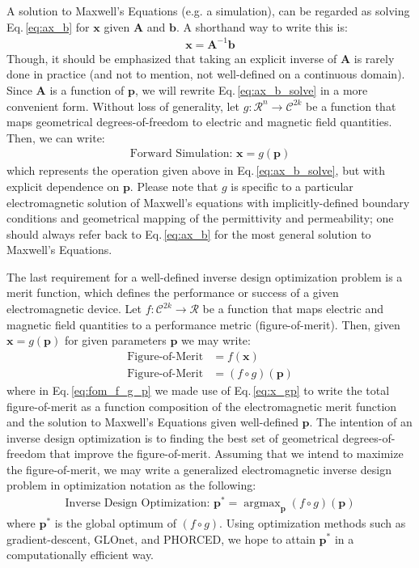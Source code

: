 \documentclass{article}
\DeclareMathOperator*{\argmax}{argmax}
\begin{document}
A solution to Maxwell's Equations (e.g. a simulation), can be regarded as solving Eq.\,\eqref{eq:ax_b} for $\mathbf{x}$ given $\mathbf{A}$ and $\mathbf{b}$. A shorthand way to write this is:
\begin{align}
    \mathbf{x} = \mathbf{A}^{-1}\mathbf{b}\label{eq:ax_b_solve}
\end{align}
Though, it should be emphasized that taking an explicit inverse of $\mathbf{A}$ is rarely done in practice (and not to mention, not well-defined on a continuous domain). Since $\mathbf{A}$ is a function of $\mathbf{p}$, we will rewrite Eq.\,\eqref{eq:ax_b_solve} in a more convenient form. Without loss of generality, let $g:\mathcal{R}^n\rightarrow \mathcal{C}^{2k}$ be a function that maps geometrical degrees-of-freedom to electric and magnetic field quantities. Then, we can write:
\begin{align}
    \boxed{\text{Forward Simulation: } \mathbf{x} = g(\mathbf{p})}\label{eq:x_gp}
\end{align}
which represents the operation given above in Eq.\,\eqref{eq:ax_b_solve}, but with explicit dependence on $\mathbf{p}$. Please note that $g$ is specific to a particular electromagnetic solution of Maxwell's equations with implicitly-defined boundary conditions and geometrical mapping of the permittivity and permeability; one should always refer back to Eq.\,\eqref{eq:ax_b} for the most general solution to Maxwell's Equations.

The last requirement for a well-defined inverse design optimization problem is a merit function, which defines the performance or success of a given electromagnetic device. Let $f:\mathcal{C}^{2k}\rightarrow\mathcal{R}$ be a function that maps electric and magnetic field quantities to a performance metric (figure-of-merit). Then, given $\mathbf{x}=g(\mathbf{p})$ for given parameters $\mathbf{p}$ we may write:
\begin{align}
    \text{Figure-of-Merit}&=f(\mathbf{x}) \\
    \text{Figure-of-Merit}&=(f\circ g)(\mathbf{p})\label{eq:fom_f_g_p}
\end{align}
where in Eq.\,\eqref{eq:fom_f_g_p} we made use of Eq.\,\eqref{eq:x_gp} to write the total figure-of-merit as a function composition of the electromagnetic merit function and the solution to Maxwell's Equations given well-defined $\mathbf{p}$. The intention of an inverse design optimization is to finding the best set of geometrical degrees-of-freedom that improve the figure-of-merit. Assuming that we intend to maximize the figure-of-merit, we may write a generalized electromagnetic inverse design problem in optimization notation as the following:
\begin{align}
    \boxed{\text{Inverse Design Optimization: } \mathbf{p}^* = \argmax_{\mathbf{p}}{(f\circ g)(\mathbf{p})}}\label{eq:p_inv}
\end{align}
where $\mathbf{p}^*$ is the global optimum of $(f\circ g)$. Using optimization methods such as gradient-descent, GLOnet, and PHORCED, we hope to attain $\mathbf{p}^*$ in a computationally efficient way.
\end{document}
